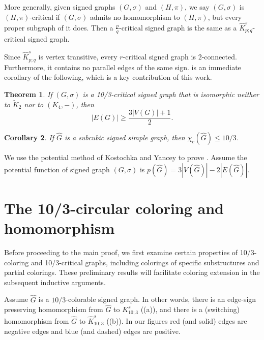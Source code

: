 \documentclass[11pt,a4paper]{article}
\newtheorem{theorem}{Theorem}
\newtheorem{corollary}[theorem]{Corollary}
\theoremstyle{definition}
\begin{document}
	
	More generally, given signed graphs $(G, \sigma)$ and $(H, \pi)$, we say $(G, \sigma)$ is $(H, \pi)$-critical if $(G, \sigma)$ admits no homomorphism to $(H, \pi)$, but every proper subgraph of it does.  Then a $\frac{p}{q}$-critical signed graph is the same as a $\widehat{K}_{p;q}^s$-critical signed graph. 
	
	Since  $\widehat{K}_{p ; q}^s$ is vertex transitive, every $r$-critical signed graph is 2-connected. Furthermore, it contains no parallel edges of the same sign.  is an immediate corollary of the following, which is a key contribution of this work.
	
	\begin{theorem}\label{thm:10/3Critical}
		If $(G,\sigma)$ is a 10/3-critical signed graph that is isomorphic neither to $\widetilde{K}_2$ nor to $(K_4,-)$, then $$|E(G)|\ge \frac{3|V(G)|+1}{2}.$$
	\end{theorem}
	
	
	
	\begin{corollary}
		If $\widehat{G}$ is a subcubic signed simple graph, then $\chi_c(\widehat{G})\leq 10/3$.
	\end{corollary}
	
	We use the potential method of Kostochka and Yancey \cite{KY14, KY14JCTB} to prove . Assume the potential function of signed graph $(G,\sigma)$ is $p(\widehat{G})=3|V(\widehat{G})|-2|E(\widehat{G})|$. 
	
	\section{The 10/3-circular coloring and homomorphism}
	
	Before proceeding to the main proof, we first examine certain properties of 10/3-coloring and 10/3-critical graphs, including colorings of specific substructures and partial colorings. These preliminary results will facilitate coloring extension in the subsequent inductive arguments.
	
	
	
	
	Assume $\widehat{G}$ is a $10/3$-colorable signed graph. In other words, there is an edge-sign preserving homomorphism from $\widehat{G}$ to $K_{10;3}^{s}$ ((a)), and there is a (switching) homomorphism from $\widehat{G}$ to $\widehat{K}_{10;3}^{s}$ ((b)). In our figures red (and solid) edges are negative edges and blue (and dashed) edges are positive.
	
\end{document}
